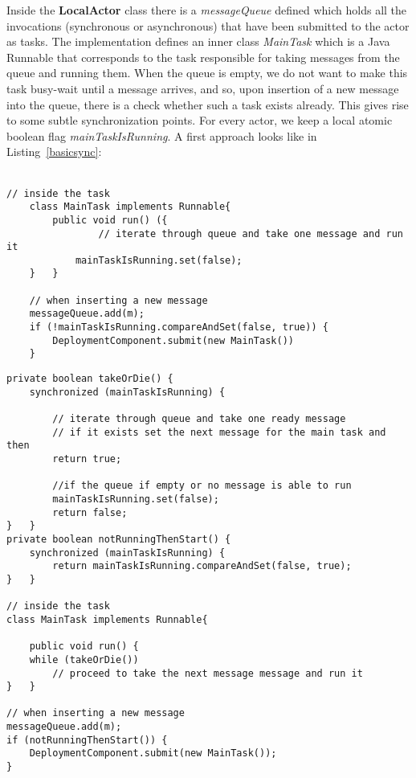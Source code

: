 \par Inside the \textbf{LocalActor} class there is a \textit{messageQueue} defined which holds all the invocations (synchronous or asynchronous) that have been submitted to the actor as tasks. The implementation defines an inner class \textit{MainTask} which is a Java Runnable that corresponds to the task responsible for taking messages from the queue and running them. When the queue is empty, we do not want to make this task busy-wait until a message arrives, and so, upon insertion of a new message into the queue, there is a check whether such a task exists already. This gives rise to some subtle synchronization points. For every actor, we keep a local atomic boolean flag \textit{mainTaskIsRunning}. A first approach looks like in Listing~\ref{basicsync}:  \\ \\

\begin{lstlisting}[float, caption= Basic Synchronization Approach, label=basicsync]
	// inside the task
	class MainTask implements Runnable{
		public void run() ({
				// iterate through queue and take one message and run it
			mainTaskIsRunning.set(false);
	}	}
	
	// when inserting a new message
	messageQueue.add(m);
	if (!mainTaskIsRunning.compareAndSet(false, true)) {
		DeploymentComponent.submit(new MainTask())
	}
\end{lstlisting}
\begin{lstlisting}[caption= Complete Synchronization Approach, label=completesync]
private boolean takeOrDie() {
	synchronized (mainTaskIsRunning) {
		
		// iterate through queue and take one ready message 
		// if it exists set the next message for the main task and then
		return true;
		
		//if the queue if empty or no message is able to run
		mainTaskIsRunning.set(false);
		return false;
}	}
private boolean notRunningThenStart() {
	synchronized (mainTaskIsRunning) {
		return mainTaskIsRunning.compareAndSet(false, true);
}	}

// inside the task
class MainTask implements Runnable{
	
	public void run() {
	while (takeOrDie())
		// proceed to take the next message message and run it	 
}	}

// when inserting a new message
messageQueue.add(m);
if (notRunningThenStart()) {
	DeploymentComponent.submit(new MainTask());
}
\end{lstlisting}


